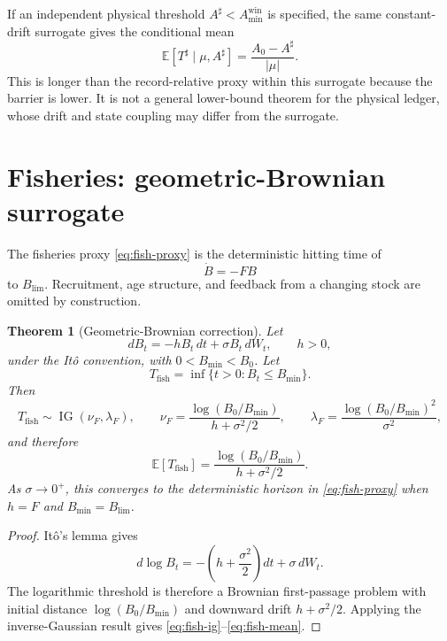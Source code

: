 \documentclass[11pt]{article}
\newtheorem{theorem}{Theorem}
\theoremstyle{definition}
\begin{document}
If an independent physical threshold $A^\sharp<A_{\min}^{\mathrm{win}}$ is specified, the same constant-drift surrogate gives the conditional mean
\begin{equation}
\mathbb E[T^\sharp\mid\mu,A^\sharp]
=\frac{A_0-A^\sharp}{|\mu|}.
\label{eq:physical-floor}
\end{equation}
This is longer than the record-relative proxy within this surrogate because the barrier is lower. It is not a general lower-bound theorem for the physical ledger, whose drift and state coupling may differ from the surrogate.

\section{Fisheries: geometric-Brownian surrogate}
\label{sec:fisheries}

The fisheries proxy \eqref{eq:fish-proxy} is the deterministic hitting time of
\[
\dot B=-FB
\]
to $B_{\mathrm{lim}}$. Recruitment, age structure, and feedback from a changing stock are omitted by construction.

\begin{theorem}[Geometric-Brownian correction]
\label{thm:fish}
Let
\begin{equation}
dB_t=-hB_t\,dt+\sigma B_t\,dW_t,
\qquad h>0,
\label{eq:gbm}
\end{equation}
under the It\^o convention, with $0<B_{\min}<B_0$. Let
\[
T_{\mathrm{fish}}=\inf\{t>0:B_t\le B_{\min}\}.
\]
Then
\begin{equation}
T_{\mathrm{fish}}\sim\operatorname{IG}(\nu_F,\lambda_F),
\qquad
\nu_F=\frac{\log(B_0/B_{\min})}{h+\sigma^2/2},
\qquad
\lambda_F=\frac{\log(B_0/B_{\min})^2}{\sigma^2},
\label{eq:fish-ig}
\end{equation}
and therefore
\begin{equation}
\mathbb E[T_{\mathrm{fish}}]
=\frac{\log(B_0/B_{\min})}{h+\sigma^2/2}.
\label{eq:fish-mean}
\end{equation}
As $\sigma\to0^+$, this converges to the deterministic horizon in \eqref{eq:fish-proxy} when $h=F$ and $B_{\min}=B_{\mathrm{lim}}$.
\end{theorem}

\begin{proof}
It\^o's lemma gives
\[
d\log B_t=-\left(h+\frac{\sigma^2}{2}\right)dt+\sigma\,dW_t.
\]
The logarithmic threshold is therefore a Brownian first-passage problem with initial distance $\log(B_0/B_{\min})$ and downward drift $h+\sigma^2/2$. Applying the inverse-Gaussian result gives \eqref{eq:fish-ig}--\eqref{eq:fish-mean}.\end{proof}
\end{document}
